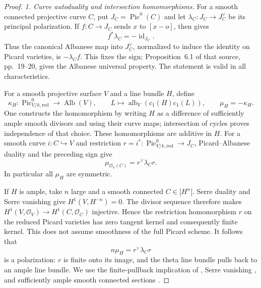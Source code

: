 \begin{proof}
\emph{1. Curve autoduality and intersection homomorphisms.}
For a smooth connected projective curve $C$, put
$J_C=\operatorname{Pic}^0(C)$ and let
$\lambda_C:J_C\to J_C^\vee$ be its principal polarization.
If $f:C\to J_C$ sends $x$ to $[x-o]$, then
\citet[Lemma 6.9 and Remark 6.10(c), author p.~23]
{D_MilneJacobians2021} gives
\[
                         f^*\lambda_C=-\operatorname{id}_{J_C}.
\]
Thus the canonical Albanese map into $J_C^\vee$, normalized
to induce the identity on Picard varieties, is $-\lambda_C f$.
This fixes the sign; Proposition~6.1 of that source,
pp.~19--20, gives the Albanese universal property. The statement
is valid in all characteristics.

For a smooth projective surface $V$ and a line bundle $H$, define
\[
 \kappa_H:\operatorname{Pic}^0_{V/k,\mathrm{red}}\to
              \operatorname{Alb}(V),\qquad
 L\longmapsto\operatorname{alb}_V(c_1(H)c_1(L)),\qquad
 \mu_H=-\kappa_H.
\]
One constructs the homomorphism by writing $H$ as a difference
of sufficiently ample smooth divisors and using their curve maps;
intersection of cycles proves independence of that choice.
These homomorphisms are additive in $H$.
For a smooth curve $i:C\hookrightarrow V$ and restriction
$r=i^*:\operatorname{Pic}^0_{V/k,\mathrm{red}}\to J_C$,
Picard--Albanese duality and the preceding sign give
\begin{equation}
                  \mu_{\mathcal O_V(C)}=r^\vee\lambda_Cr.
                                                        \tag{AM.5}
\end{equation}
In particular all $\mu_H$ are symmetric.

If $H$ is ample, take $n$ large and a smooth connected
$C\in|H^n|$. Serre duality and Serre vanishing give
$H^1(V,H^{-n})=0$. The divisor sequence therefore makes
$H^1(V,\mathcal O_V)\to H^1(C,\mathcal O_C)$ injective.
Hence the restriction homomorphism $r$ on the reduced Picard
varieties has zero tangent kernel and consequently finite kernel.
This does not assume smoothness of the full Picard scheme.
It follows that
\begin{equation}
                           n\mu_H=r^\vee\lambda_Cr       \tag{AM.6}
\end{equation}
is a polarization: $r$ is finite onto its image, and the theta
line bundle pulls back to an ample line bundle. We use the
finite-pullback implication of
\citet[Lemma 30.17.2 and its proof]{frC3beStacksFiniteAmple},
Serre vanishing
\citep[Lemma 30.17.1]{frC3azStacksSerre}, and sufficiently
ample smooth connected sections
\citep[proof of Lemma 45.8.3]{frC3azStacksBertini}.


\end{proof}
